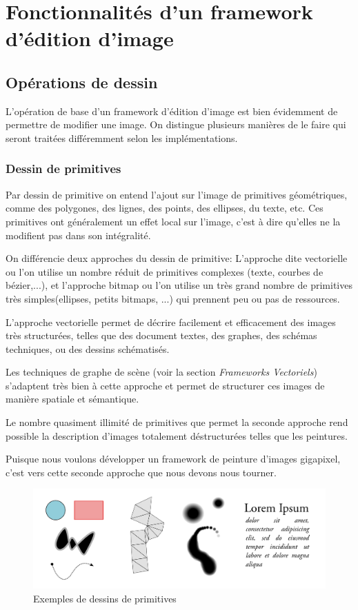 	\section{Fonctionnalités d'un framework d'édition d'image}
		\subsection{Opérations de dessin}
			L'opération de base d'un framework d'édition d'image est bien évidemment de permettre de 
			modifier une image. On distingue plusieurs manières de le faire qui seront traitées différemment
			selon les implémentations.
			\subsubsection{Dessin de primitives}
				Par dessin de primitive on entend l'ajout sur l'image de primitives géométriques, comme
				des polygones, des lignes, des points, des ellipses, du texte, etc. Ces primitives ont généralement un 
				effet local sur l'image, c'est à dire qu'elles ne la modifient pas dans son intégralité. 

				On différencie deux approches du dessin de primitive: L'approche dite vectorielle ou l'on utilise un 
				nombre réduit de primitives complexes (texte, courbes de bézier,...), et l'approche bitmap ou l'on utilise
				un très grand nombre de primitives très simples(ellipses, petits bitmaps, ...) qui prennent peu ou pas
				de ressources. 

				L'approche vectorielle permet de décrire facilement et efficacement des images très structurées, telles
				que des document textes, des graphes, des schémas techniques, ou des dessins schématisés. 

				Les techniques de graphe de scène (voir la section \emph{Frameworks Vectoriels}) s'adaptent très bien
				à cette approche et permet de structurer ces images de manière spatiale et sémantique.

				Le nombre quasiment illimité de primitives que permet la seconde approche rend possible la description
				d'images totalement déstructurées telles que les peintures.

				Puisque nous voulons développer un framework de peinture d'images gigapixel, c'est vers cette
				seconde approche que nous devons nous tourner. 

				\begin{figure}[h]
					\centering
					\includegraphics[width=\textwidth]{images/primitives}
					\caption{Exemples de dessins de primitives}
					\label{fig:primitives}
				\end{figure}
